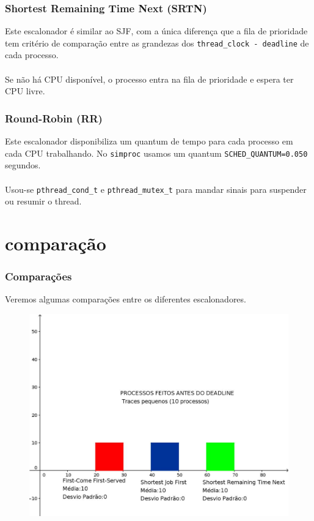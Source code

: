 \documentclass{beamer}
\begin{document}

\begin{frame}
  \frametitle{Shortest Remaining Time Next (SRTN)}
  Este escalonador é similar ao SJF, com a única diferença que a fila de prioridade tem critério de comparação entre as grandezas dos \texttt{thread\_clock - deadline} de cada processo. \\~\\

  Se não há CPU disponível, o processo entra na fila de prioridade e espera ter CPU livre.
\end{frame}

\begin{frame}
  \frametitle{Round-Robin (RR)}
  Este escalonador disponibiliza um quantum de tempo para cada processo em cada CPU trabalhando. No \texttt{simproc} usamos um quantum \texttt{SCHED\_QUANTUM=0.050} segundos. \\~\\

  Usou-se \texttt{pthread\_cond\_t} e \texttt{pthread\_mutex\_t} para mandar sinais para suspender ou resumir o thread.
\end{frame}

\section{comparação}

\begin{frame}
  \frametitle{Comparações}
  Veremos algumas comparações entre os diferentes escalonadores.
\end{frame}

\begin{frame}
\begin{figure}[h]
  \centering\includegraphics[scale=0.25]{table1.jpg}
\end{figure}
\end{frame}
\end{document}
